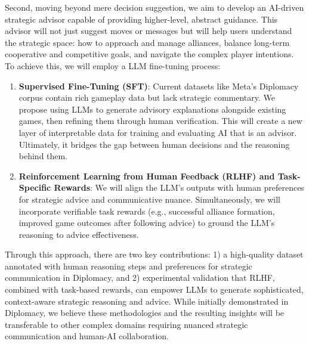 \documentclass[oneside]{memoir}
\begin{document}
Second, moving beyond mere decision suggestion, we aim to develop an AI-driven strategic advisor capable of providing higher-level, abstract guidance. This advisor will not just suggest moves or messages but will help users understand the strategic space: how to approach and manage alliances, balance long-term cooperative and competitive goals, and navigate the complex player intentions. To achieve this, we will employ a LLM fine-tuning process:
\begin{enumerate}
\item \textbf{Supervised Fine-Tuning (SFT)}: Current datasets like Meta’s Diplomacy corpus contain rich gameplay data but lack strategic commentary. We propose using LLMs to generate advisory explanations alongside existing games, then refining them through human verification. This will create a new layer of interpretable data for training and evaluating AI that is an advisor. Ultimately, it bridges the gap between human decisions and the reasoning behind them.
\item \textbf{Reinforcement Learning from Human Feedback (RLHF) and Task-Specific Rewards}: We will align the LLM's outputs with human preferences for strategic advice and communicative nuance. Simultaneously, we will incorporate verifiable task rewards (e.g., successful alliance formation, improved game outcomes after following advice) to ground the LLM's reasoning to advice effectiveness.
\end{enumerate}
Through this approach, there are two key contributions: 1) a high-quality dataset annotated with human reasoning steps and preferences for strategic communication in Diplomacy, and 2) experimental validation that RLHF, combined with task-based rewards, can empower LLMs to generate sophisticated, context-aware strategic reasoning and advice. While initially demonstrated in Diplomacy, we believe these methodologies and the resulting insights will be transferable to other complex domains requiring nuanced strategic communication and human-AI collaboration.




\end{document}
